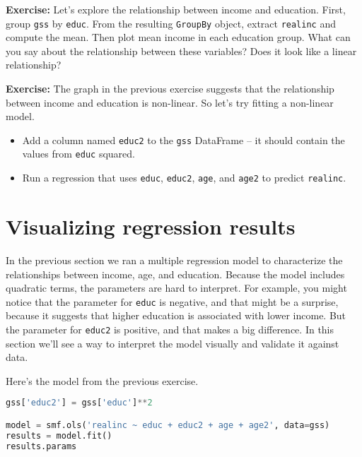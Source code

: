 \textbf{Exercise:} Let's explore the relationship between income and
education. First, group \passthrough{\lstinline!gss!} by
\passthrough{\lstinline!educ!}. From the resulting
\passthrough{\lstinline!GroupBy!} object, extract
\passthrough{\lstinline!realinc!} and compute the mean. Then plot mean
income in each education group. What can you say about the relationship
between these variables? Does it look like a linear relationship?

\textbf{Exercise:} The graph in the previous exercise suggests that the
relationship between income and education is non-linear. So let's try
fitting a non-linear model.

\begin{itemize}
\item
  Add a column named \passthrough{\lstinline!educ2!} to the
  \passthrough{\lstinline!gss!} DataFrame -- it should contain the
  values from \passthrough{\lstinline!educ!} squared.
\item
  Run a regression that uses \passthrough{\lstinline!educ!},
  \passthrough{\lstinline!educ2!}, \passthrough{\lstinline!age!}, and
  \passthrough{\lstinline!age2!} to predict
  \passthrough{\lstinline!realinc!}.
\end{itemize}

\section{Visualizing regression
results}\label{visualizing-regression-results}

In the previous section we ran a multiple regression model to
characterize the relationships between income, age, and education.
Because the model includes quadratic terms, the parameters are hard to
interpret. For example, you might notice that the parameter for
\passthrough{\lstinline!educ!} is negative, and that might be a
surprise, because it suggests that higher education is associated with
lower income. But the parameter for \passthrough{\lstinline!educ2!} is
positive, and that makes a big difference. In this section we'll see a
way to interpret the model visually and validate it against data.

\pagebreak

Here's the model from the previous exercise.

\begin{lstlisting}[language=Python,style=source]
gss['educ2'] = gss['educ']**2

model = smf.ols('realinc ~ educ + educ2 + age + age2', data=gss)
results = model.fit()
results.params
\end{lstlisting}

